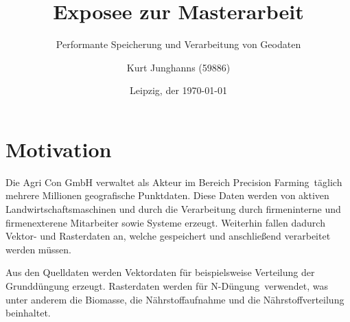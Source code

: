 \documentclass[
a4paper,     %
12pt         %
]{scrartcl}  %
\title{Exposee zur Masterarbeit}
\subtitle{Performante Speicherung und Verarbeitung von Geodaten}
\author{Kurt Junghanns (59886)}
\date{Leipzig, der \today{}}
\begin{document}

 \maketitle

 \tableofcontents







\section{Motivation}

Die Agri Con GmbH verwaltet als Akteur im Bereich \glqq Precision Farming\grqq \ täglich mehrere Millionen geografische Punktdaten.
Diese Daten werden von aktiven Landwirtschaftsmaschinen und durch die Verarbeitung durch firmeninterne und firmenexterene Mitarbeiter sowie Systeme erzeugt.
Weiterhin fallen dadurch Vektor- und Rasterdaten an, welche gespeichert und anschließend verarbeitet werden müssen.

Aus den Quelldaten werden Vektordaten für beispielsweise Verteilung der Grunddüngung erzeugt. Rasterdaten werden für \glqq N-Düngung\grqq \ verwendet, was unter anderem die Biomasse, die Nährstoffaufnahme und die Nährstoffverteilung beinhaltet.
\end{document}
